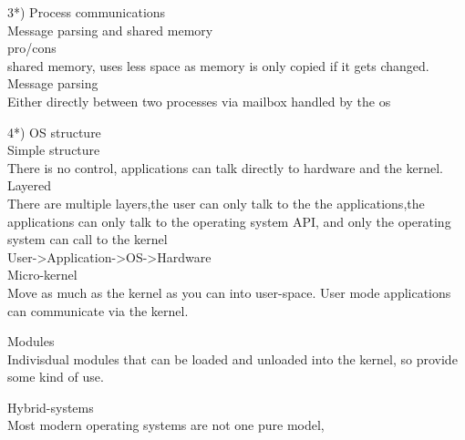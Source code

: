 \documentclass[a4paper,10pt,titlepage]{report}
\begin{document}
3*)
Process communications \\
\hspace{10mm}Message parsing and shared memory \\ 
\hspace{15mm} pro/cons \\
\hspace{10mm} shared memory, uses less space as memory is only copied if it gets changed.\\
\hspace{10mm} Message parsing\\
\hspace{15mm} Either directly between two processes via mailbox handled by the os \\
\vspace{5mm}


4*) 
OS structure \\ 

\hspace{10mm}	Simple structure \\
\hspace{15mm}    	There is no control, applications can talk directly to hardware and the kernel.\\


\hspace{10mm}    Layered \\
\hspace{15mm}    	There are multiple layers,the user can only talk to the the applications,the applications can only talk to the operating system API, and only the operating system can call to the kernel \\
\hspace{15mm}        User->Application->OS->Hardware \\

\hspace{10mm}	Micro-kernel\\
\hspace{15mm}		Move as much as the kernel as you can into user-space. User mode applications can communicate via the kernel.
    
\hspace{10mm}   Modules \\
\hspace{15mm}		Indivisdual modules that can be loaded and unloaded into the kernel, so provide some kind of use.
                
\hspace{10mm}    Hybrid-systems \\
\hspace{15mm} Most modern operating systems are not one pure model, 
\end{document}

